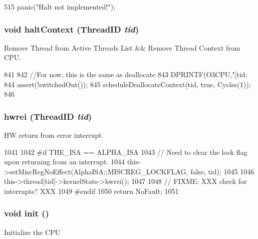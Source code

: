 \begin{DoxyCode}
515 { panic("Halt not implemented!\n"); }
\end{DoxyCode}
\hypertarget{classFullO3CPU_ac2156e0955d5e1ef6e06cd0e2ab218e4}{
\subsubsection[{haltContext}]{\setlength{\rightskip}{0pt plus 5cm}void haltContext ({\bf ThreadID} {\em tid})}}
\label{classFullO3CPU_ac2156e0955d5e1ef6e06cd0e2ab218e4}
Remove Thread from Active Threads List \&\& Remove Thread Context from CPU. 


\begin{DoxyCode}
841 {
842     //For now, this is the same as deallocate
843     DPRINTF(O3CPU,"[tid:%
844     assert(!switchedOut());
845     scheduleDeallocateContext(tid, true, Cycles(1));
846 }
\end{DoxyCode}
\hypertarget{classFullO3CPU_a3820de4f7e76b56c6d795f27bf49c097}{
\subsubsection[{hwrei}]{ hwrei ({\bf ThreadID} {\em tid})}}
\label{classFullO3CPU_a3820de4f7e76b56c6d795f27bf49c097}
HW return from error interrupt. 


\begin{DoxyCode}
1041 {
1042 #if THE_ISA == ALPHA_ISA
1043     // Need to clear the lock flag upon returning from an interrupt.
1044     this->setMiscRegNoEffect(AlphaISA::MISCREG_LOCKFLAG, false, tid);
1045 
1046     this->thread[tid]->kernelStats->hwrei();
1047 
1048     // FIXME: XXX check for interrupts? XXX
1049 #endif
1050     return NoFault;
1051 }
\end{DoxyCode}
\hypertarget{classFullO3CPU_a02fd73d861ef2e4aabb38c0c9ff82947}{
\subsubsection[{init}]{\setlength{\rightskip}{0pt plus 5cm}void init ()}}
\label{classFullO3CPU_a02fd73d861ef2e4aabb38c0c9ff82947}
Initialize the CPU 


